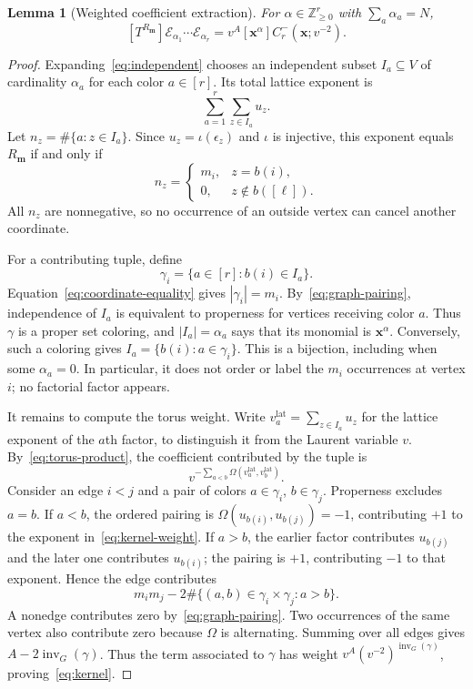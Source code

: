 \documentclass[11pt,reqno]{amsart}
\newcommand{\NN}{\mathbb Z_{\geq0}}
\newcommand{\xx}{\mathbf x}
\newcommand{\mm}{\mathbf m}
\newcommand{\EE}{\mathscr E}
\newcommand{\inv}{\operatorname{inv}}
\newtheorem{lemma}[theorem]{Lemma}
\theoremstyle{definition}
\theoremstyle{remark}
\numberwithin{equation}{section}
\begin{document}
\begin{lemma}[Weighted coefficient extraction]\label{lem:kernel}
For $\alpha\in\NN^r$ with $\sum_a\alpha_a=N$,
\begin{equation}\label{eq:kernel}
 [T^{R_{\mm}}]\EE_{\alpha_1}\cdots\EE_{\alpha_r}
     =v^A[\xx^\alpha]C^-_r(\xx;v^{-2}).
\end{equation}
\end{lemma}
\begin{proof}
Expanding~\eqref{eq:independent} chooses an independent subset
$I_a\subseteq V$ of cardinality $\alpha_a$ for each color $a\in[r]$.
Its total lattice exponent is
\[
 \sum_{a=1}^r\sum_{z\in I_a}u_z.
\]
Let $n_z=\#\{a:z\in I_a\}$.  Since $u_z=\iota(\epsilon_z)$ and
$\iota$ is injective, this exponent equals $R_{\mm}$ if and only if
\begin{equation}\label{eq:coordinate-equality}
 n_z=\begin{cases}m_i,&z=b(i),\\0,&z\notin b([\ell]).\end{cases}
\end{equation}
All $n_z$ are nonnegative, so no occurrence of an outside vertex can
cancel another coordinate.

For a contributing tuple, define
\begin{equation}\label{eq:kernel-bijection}
 \gamma_i=\{a\in[r]:b(i)\in I_a\}.
\end{equation}
Equation~\eqref{eq:coordinate-equality} gives $|\gamma_i|=m_i$.
By~\eqref{eq:graph-pairing}, independence of $I_a$ is equivalent to
properness for vertices receiving color $a$.  Thus $\gamma$ is a proper
set coloring, and $|I_a|=\alpha_a$ says that its monomial is
$\xx^\alpha$.  Conversely, such a coloring gives
$I_a=\{b(i):a\in\gamma_i\}$.  This is a bijection, including when
some $\alpha_a=0$.  In particular, it does not order or label the
$m_i$ occurrences at vertex $i$; no factorial factor appears.

It remains to compute the torus weight.  Write
$v_a^{\mathrm{lat}}=\sum_{z\in I_a}u_z$ for the lattice exponent of the
$a$th factor, to distinguish it from the Laurent variable $v$.
By~\eqref{eq:torus-product}, the coefficient contributed by the tuple
is
\begin{equation}\label{eq:kernel-weight}
 v^{-\sum_{a<b}\Omega(v_a^{\mathrm{lat}},v_b^{\mathrm{lat}})}.
\end{equation}
Consider an edge $i<j$ and a pair of colors
$a\in\gamma_i$, $b\in\gamma_j$.  Properness excludes $a=b$.
If $a<b$, the ordered pairing is
$\Omega(u_{b(i)},u_{b(j)})=-1$, contributing $+1$ to the exponent
in~\eqref{eq:kernel-weight}.  If $a>b$, the earlier factor contributes
$u_{b(j)}$ and the later one contributes $u_{b(i)}$; the pairing is
$+1$, contributing $-1$ to that exponent.  Hence the edge contributes
\[
 m_i m_j-2\#\{(a,b)\in\gamma_i\times\gamma_j:a>b\}.
\]
A nonedge contributes zero by~\eqref{eq:graph-pairing}.  Two occurrences
of the same vertex also contribute zero because $\Omega$ is
alternating.  Summing over all edges gives
$A-2\inv_G(\gamma)$.  Thus the term associated to $\gamma$ has weight
$v^A(v^{-2})^{\inv_G(\gamma)}$, proving~\eqref{eq:kernel}.
\end{proof}
\end{document}
